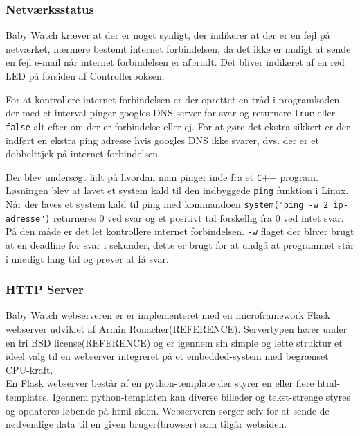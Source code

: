 \subsubsection*{Netværksstatus}

Baby Watch kræver at der er noget synligt, der indikerer at der er en fejl på netværket, nærmere bestemt internet forbindelsen, da det ikke er muligt at sende en fejl e-mail når internet forbindelsen er afbrudt. Det bliver indikeret af en rød LED på forsiden af Controllerboksen.

For at kontrollere internet forbindelsen er der oprettet en tråd i programkoden der med et interval pinger googles DNS server for svar og returnere \verb+true+ eller \verb+false+ alt efter om der er forbindelse eller ej. For at gøre det ekstra sikkert er der indført en ekstra ping adresse hvis googles DNS ikke svarer, dvs. der er et dobbelttjek på internet forbindelsen.

Der blev undersøgt lidt på hvordan man pinger inde fra et \verb+C+++ program. Løsningen blev at lavet et system kald til den indbyggede \verb+ping+ funktion i Linux. Når der laves et system kald til ping med kommandoen \verb+system("ping -w 2 ip-adresse")+ returneres 0 ved svar og et positivt tal forskellig fra 0 ved intet svar. På den måde er det let kontrollere internet forbindelsen. \verb+-w+ flaget der bliver brugt at en deadline for svar i sekunder, dette er brugt for at undgå at programmet står i unødigt lang tid og prøver at få svar.

\subsubsection*{HTTP Server}

Baby Watch webserveren er er implementeret med en microframework Flask  webserver udviklet af Armin Ronacher(REFERENCE). Servertypen hører under en fri BSD license(REFERENCE) og er igennem sin simple og lette struktur et ideel valg til en webserver integreret på et embedded-system med begrænset CPU-kraft. \\
En Flask webserver består af en python-template der styrer en eller flere html-templates. Igennem python-templaten kan diverse billeder og tekst-strenge styres og opdateres løbende på html siden. Webserveren sørger selv for at sende de nødvendige data til en given bruger(browser) som tilgår websiden. 

